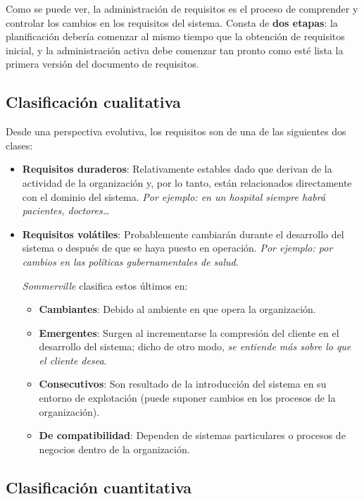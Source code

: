 Como se puede ver, la administración de requisitos es el proceso de comprender y controlar los cambios en los requisitos del sistema. Consta de \textbf{dos etapas}: la planificación debería comenzar al mismo tiempo que la obtención de requisitos inicial, y la administración activa debe comenzar tan pronto como esté lista la primera versión del documento de requisitos.

\subsection{Clasificación cualitativa}

Desde una perspectiva evolutiva, los requisitos son de una de las siguientes dos clases:

\begin{itemize}
    \item \textbf{Requisitos duraderos}: Relativamente estables dado que derivan de la actividad de la organización y, por lo tanto, están relacionados directamente con el dominio del sistema. \textit{Por ejemplo: en un hospital siempre habrá pacientes, doctores\ldots}
    \item \textbf{Requisitos volátiles}: Probablemente cambiarán durante el desarrollo del sistema o después de que se haya puesto en operación. \textit{Por ejemplo: por cambios en las políticas gubernamentales de salud}.
    
    \textit{Sommerville} clasifica estos últimos en:
    \begin{itemize}
        \item \textbf{Cambiantes}: Debido al ambiente en que opera la organización.
        \item \textbf{Emergentes}: Surgen al incrementarse la compresión del cliente en el desarrollo del sistema; dicho de otro modo, \textit{se entiende más sobre lo que el cliente desea}.
        \item \textbf{Consecutivos}: Son resultado de la introducción del sistema en su entorno de explotación (puede suponer cambios en los procesos de la organización).
        \item \textbf{De compatibilidad}: Dependen de sistemas particulares o procesos de negocios dentro de la organización.
    \end{itemize}
\end{itemize}

\subsection{Clasificación cuantitativa}

